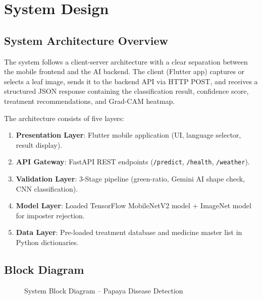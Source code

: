 \documentclass[12pt,a4paper]{report}
\begin{document}
\chapter{System Design}

\section{System Architecture Overview}
The system follows a client-server architecture with a clear separation between the mobile frontend and the AI backend. The client (Flutter app) captures or selects a leaf image, sends it to the backend API via HTTP POST, and receives a structured JSON response containing the classification result, confidence score, treatment recommendations, and Grad-CAM heatmap.

The architecture consists of five layers:
\begin{enumerate}
    \item \textbf{Presentation Layer}: Flutter mobile application (UI, language selector, result display).
    \item \textbf{API Gateway}: FastAPI REST endpoints (\texttt{/predict}, \texttt{/health}, \texttt{/weather}).
    \item \textbf{Validation Layer}: 3-Stage pipeline (green-ratio, Gemini AI shape check, CNN classification).
    \item \textbf{Model Layer}: Loaded TensorFlow MobileNetV2 model + ImageNet model for imposter rejection.
    \item \textbf{Data Layer}: Pre-loaded treatment database and medicine master list in Python dictionaries.
\end{enumerate}

\section{Block Diagram}

\begin{figure}[h!]
\centering
\caption{System Block Diagram -- Papaya Disease Detection}
\label{fig:block_diagram}
\end{figure}
\end{document}
